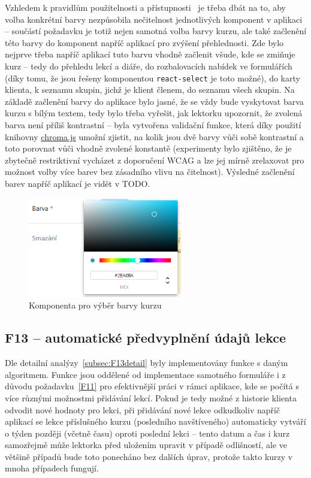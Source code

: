 Vzhledem k pravidlům použitelnosti a přístupnosti~\cite{wcag} je třeba dbát na to, aby volba konkrétní barvy nezpůsobila nečitelnost jednotlivých komponent v aplikaci -- součástí požadavku je totiž nejen samotná volba barvy kurzu, ale také začlenění této barvy do komponent napříč aplikací pro zvýšení přehlednosti. Zde bylo nejprve třeba napříč aplikací tuto barvu vhodně začlenit všude, kde se zmiňuje kurz -- tedy do přehledu lekcí a diáře, do rozbalovacích nabídek ve formulářích (díky tomu, že jsou řešeny komponentou \verb|react-select| je toto možné), do karty klienta, k seznamu skupin, jichž je klient členem, do seznamu všech skupin. Na základě začlenění barvy do aplikace bylo jasné, že se vždy bude vyskytovat barva kurzu s bílým textem, tedy bylo třeba vyřešit, jak lektorku upozornit, že zvolená barva není příliš kontrastní -- byla vytvořena validační funkce, která díky použití knihovny \href{https://github.com/gka/chroma.js/}{chroma.js} umožní zjistit, na kolik jsou dvě barvy vůči sobě kontrastní a toto porovnat vůči vhodně zvolené konstantě (experimenty bylo zjištěno, že je zbytečně restriktivní vycházet z doporučení WCAG a lze jej mírně zrelaxovat pro možnost volby více barev bez zásadního vlivu na čitelnost). Výsledné začlenění barev napříč aplikací je vidět v TODO.

\begin{figure}[h]\centering
    \includegraphics[width=0.6\textwidth]{img/ui-screen-barva.png}
    \caption{Komponenta pro výběr barvy kurzu}\label{fig:ui-screen-barva}
\end{figure}

\subsection{F13 -- automatické předvyplnění údajů lekce}

Dle detailní analýzy~\ref{subsec:F13detail} byly implementovány funkce s daným algoritmem. Funkce jsou oddělené od implementace samotného formuláře i z důvodu požadavku~\ref{F11} pro efektivnější práci v rámci aplikace, kde se počítá s více různými možnostmi přidávání lekcí. Pokud je tedy možné z historie klienta odvodit nové hodnoty pro lekci, při přidávání nové lekce odkudkoliv napříč aplikací se lekce příslušného kurzu (posledního navštíveného) automaticky vytváří o týden později (včetně času) oproti poslední lekci -- tento datum a čas i kurz samozřejmě může lektorka před uložením upravit v případě odlišností, ale ve většině případů bude toto ponecháno bez dalších úprav, protože takto kurzy v mnoha případech fungují. 

